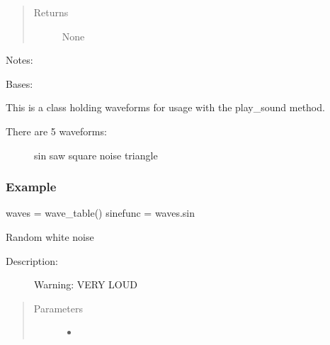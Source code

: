\documentclass[letterpaper,10pt,english]{sphinxmanual}
\begin{document}
\begin{fulllineitems}
\begin{fulllineitems}
\begin{quote}
\begin{description}
\item[{Returns}] \leavevmode
\sphinxAtStartPar
None

\end{description}\end{quote}

\sphinxAtStartPar
Notes:

\end{fulllineitems}


\end{fulllineitems}


\begin{fulllineitems}
\label{\detokenize{audio:audio.wave_table}}
\pysigstartsignatures
{}
\pysigstopsignatures
\sphinxAtStartPar
Bases: 

\sphinxAtStartPar
This is a class holding waveforms for usage with the play\_sound method.
\begin{description}
\item[{There are 5 waveforms:}] \leavevmode
\sphinxAtStartPar
sin
saw
square
noise
triangle

\end{description}
\subsubsection*{Example}

\sphinxAtStartPar
waves = wave\_table()
sinefunc = waves.sin

\begin{fulllineitems}
\label{\detokenize{audio:audio.wave_table.noise}}
\pysigstartsignatures
{}
\pysigstopsignatures
\sphinxAtStartPar
Random white noise
\begin{description}
\item[{Description:}] \leavevmode
\sphinxAtStartPar
Warning: VERY LOUD

\end{description}
\begin{quote}\begin{description}
\item[{Parameters}] \leavevmode\begin{itemize}
\item {} 
\sphinxAtStartPar
{} \textendash{} 


\end{itemize}
\end{description}
\end{quote}
\end{fulllineitems}
\end{fulllineitems}
\end{document}
